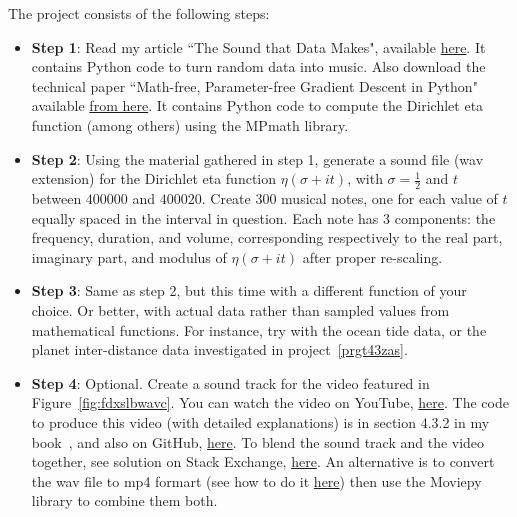 \documentclass[oneside,10pt]{book}
\begin{document}
\noindent The project consists of the following steps: \vspace{1ex} 

\begin{itemize}
\item[] {\bf Step 1}:  Read my article ``The Sound that Data Makes", available \href{https://mltechniques.com/2022/08/29/the-sound-that-data-makes/}{here}. It contains Python code to turn random data into music. Also download the technical paper
 ``Math-free, Parameter-free Gradient Descent in Python" available \href{https://mltechniques.com/2023/01/28/math-free-parameter-free-gradient-descent-in-python/}{from here}. It contains Python code to compute the Dirichlet eta function (among others) using the MPmath 
 library. \vspace{1ex}
\item[] {\bf Step 2}:  Using the material gathered in step 1, generate a sound file (wav extension) for the Dirichlet eta function
 $\eta(\sigma + it)$, with $\sigma=\frac{1}{2}$ and $t$ between $\num{400000}$ and $\num{400020}$. Create 300 musical notes,
 one for each value of $t$ equally spaced in the interval in question. Each note has 3 components: 
the frequency, duration, and volume, corresponding respectively to the real part, imaginary part, and
 modulus of  $\eta(\sigma + it)$ after proper re-scaling. \vspace{1ex}
\item[] {\bf Step 3}:  Same as step 2, but this time with a different function of your choice. Or better, with actual data rather than sampled
 values from mathematical functions. For instance, try with the ocean tide data, or the planet inter-distance data investigated in
 project~\ref{prgt43zas}.\vspace{1ex}
\item[] {\bf Step 4}: Optional. Create a sound track for the video featured in Figure~\ref{fig:fdxslbwavc}. You can
 watch the video on YouTube, \href{https://www.youtube.com/watch?v=XI5MhyNc7us}{here}.  
The code to produce this video (with detailed explanations) is in section 4.3.2 in my book~\cite{vgelsevier}, 
and also on GitHub, \href{https://github.com/VincentGranville/Visualizations/blob/main/Source-Code/image2R.py}{here}.
To blend the sound track and the video together, see solution on Stack Exchange, 
\href{https://stackoverflow.com/questions/28219049/combining-an-audio-file-with-video-file-in-python}{here}. An alternative
 is to convert the wav file to mp4 formart (see how to do it \href{https://stackoverflow.com/questions/48728145/video-editing-with-python-adding-a-background-music-to-a-video-with-sound}{here}) then use the \textcolor{index}{Moviepy} library to combine them both.
\end{itemize}
\vspace{1ex} 
\end{document}
